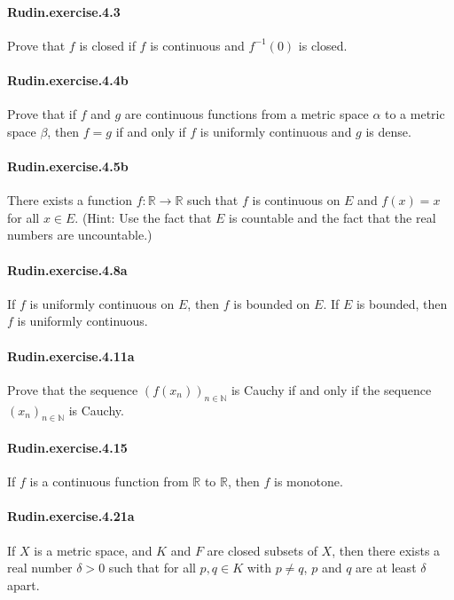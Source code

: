 \documentclass{article}
\begin{document}
\paragraph{Rudin.exercise.4.3} Prove that $f$ is closed if $f$ is continuous and $f^{-1}(0)$ is closed.

\paragraph{Rudin.exercise.4.4b} Prove that if $f$ and $g$ are continuous functions from a metric space $α$ to a metric space $β$, then $f = g$ if and only if $f$ is uniformly continuous and $g$ is dense.

\paragraph{Rudin.exercise.4.5b} There exists a function $f : \mathbb{R} \to \mathbb{R}$ such that $f$ is continuous on $E$ and $f(x) = x$ for all $x \in E$. (Hint: Use the fact that $E$ is countable and the fact that the real numbers are uncountable.)

\paragraph{Rudin.exercise.4.8a} If $f$ is uniformly continuous on $E$, then $f$ is bounded on $E$. If $E$ is bounded, then $f$ is uniformly continuous.

\paragraph{Rudin.exercise.4.11a} Prove that the sequence $(f(x_n))_{n\in\mathbb{N}}$ is Cauchy if and only if the sequence $(x_n)_{n\in\mathbb{N}}$ is Cauchy.

\paragraph{Rudin.exercise.4.15} If $f$ is a continuous function from $\mathbb{R}$ to $\mathbb{R}$, then $f$ is monotone.

\paragraph{Rudin.exercise.4.21a} If $X$ is a metric space, and $K$ and $F$ are closed subsets of $X$, then there exists a real number $\delta > 0$ such that for all $p, q \in K$ with $p \neq q$, $p$ and $q$ are at least $\delta$ apart.
\end{document}
